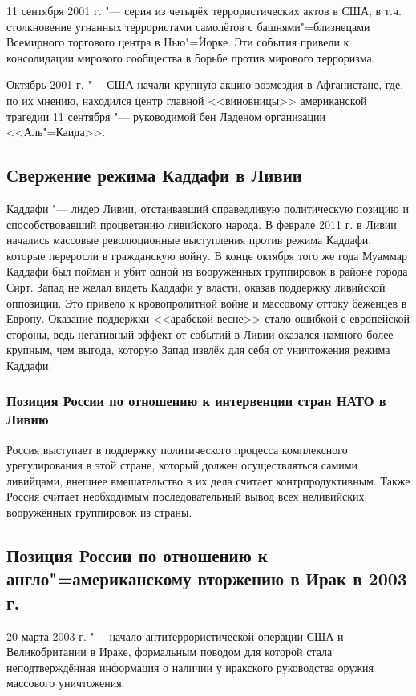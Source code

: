 11 сентября 2001 г. "--- серия из четырёх террористических актов в США, в т.ч. столкновение угнанных террористами самолётов с башнями"=близнецами Всемирного торгового центра в Нью"=Йорке. Эти события привели к консолидации мирового сообщества в борьбе против мирового терроризма.

Октябрь 2001 г. "--- США начали крупную акцию возмездия в Афганистане, где, по их мнению, находился центр главной <<виновницы>> американской трагедии 11 сентября "--- руководимой бен Ладеном организации <<Аль"=Каида>>.

\subsection{Свержение режима Каддафи в Ливии}
Каддафи "--- лидер Ливии, отстаивавший справедливую политическую позицию и способствовавший процветанию ливийского народа. В феврале 2011 г. в Ливии начались массовые революционные выступления против режима Каддафи, которые переросли в гражданскую войну. В конце октября того же года Муаммар Каддафи был пойман и убит одной из вооружённых группировок в районе города Сирт. Запад не желал видеть Каддафи у власти, оказав поддержку ливийской оппозиции. Это привело к кровопролитной войне и массовому оттоку беженцев в Европу. Оказание поддержки <<арабской весне>> стало ошибкой с европейской стороны, ведь негативный эффект от событий в Ливии оказался намного более крупным, чем выгода, которую Запад извлёк для себя от уничтожения режима Каддафи.

\subsubsection{Позиция России по отношению к интервенции стран НАТО в Ливию}
Россия выступает в поддержку политического процесса комплексного урегулирования в этой стране, который должен осуществляться самими ливийцами, внешнее вмешательство в их дела считает контрпродуктивным. Также Россия считает необходимым последовательный вывод всех неливийских вооружённых группировок из страны.

\subsection{Позиция России по отношению к англо"=американскому вторжению в Ирак в 2003 г.}
20 марта 2003 г. "--- начало антитеррористической операции США и Великобритании в Ираке, формальным поводом для которой стала неподтверждённая информация о наличии у иракского руководства оружия массового уничтожения. 

